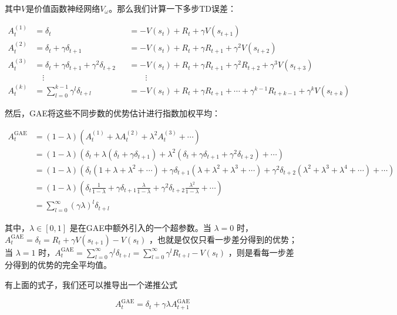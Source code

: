 \documentclass[lang=cn,newtx,10pt,scheme=chinese]{elegantbook}
\begin{document}
其中$V$是价值函数神经网络$V_\omega$。那么我们计算一下多步TD误差：

\begin{equation}
\begin{aligned}
A_t^{(1)} &= \delta_t &&= -V(s_t)+R_t+\gamma V(s_{t+1}) \\
A_t^{(2)} &= \delta_t+\gamma\delta_{t+1} &&= -V(s_t)+R_t+\gamma R_{t+1}+\gamma^2 V(s_{t+2}) \\
A_t^{(3)} &= \delta_t+\gamma\delta_{t+1}+\gamma^2 \delta_{t+2} &&= -V(s_t)+R_t+\gamma R_{t+1}+ \gamma^2R_{t+2} +\gamma^3 V(s_{t+3}) \\
&\quad\vdots &&\quad\quad\vdots \\
A_t^{(k)} &= \sum_{l=0}^{k-1}\gamma^l\delta_{t+l} &&= -V(s_t)+R_t+\gamma R_{t+1}+\cdots+\gamma^{k-1}R_{t+k-1}+\gamma^kV(s_{t+k})
\end{aligned}
\end{equation}

然后，GAE将这些不同步数的优势估计进行指数加权平均：

\begin{equation}
\begin{aligned}
A_t^{\text{GAE}} &= (1-\lambda)(A_t^{(1)}+\lambda A_t^{(2)}+\lambda^2A_t^{(3)}+\cdots) \\
&= (1-\lambda)(\delta_t+\lambda(\delta_t+\gamma\delta_{t+1})+\lambda^2(\delta_t+\gamma\delta_{t+1}+\gamma^2\delta_{t+2})+\cdots) \\
&= (1-\lambda)(\delta_t(1+\lambda+\lambda^2+\cdots)+\gamma\delta_{t+1}(\lambda+\lambda^2+\lambda^3+\cdots)+\gamma^2\delta_{t+2}(\lambda^2+\lambda^3+\lambda^4+\cdots)+\cdots) \\
&= (1-\lambda)\left({\delta_t\frac{1}{1-\lambda}+\gamma\delta_{t+1}\frac{\lambda}{1-\lambda}+\gamma^2\delta_{t+2}\frac{\lambda^2}{1-\lambda}+\cdots}\right) \\
&= \sum_{l=0}^{\infty}(\gamma\lambda)^l\delta_{t+l}
\end{aligned}
\end{equation}

其中，$\lambda\in [0,1]$ 是在GAE中额外引入的一个超参数。当 $\lambda=0$ 时，$A_t^{\text{GAE}}=\delta_t=R_t+\gamma V(s_{t+1})-V(s_t)$ ，也就是仅仅只看一步差分得到的优势；当 $\lambda=1$ 时，$A_t^{\text{GAE}}=\sum_{l=0}^{\infty}\gamma^l\delta_{t+l}=\sum_{l=0}^{\infty}\gamma^lR_{t+l}-V(s_t)$ ，则是看每一步差分得到的优势的完全平均值。

有上面的式子，我们还可以推导出一个递推公式

\begin{equation}
A_t^{\text{GAE}} = \delta_t + \gamma\lambda A_{t+1}^{\text{GAE}}
\end{equation}
\end{document}
